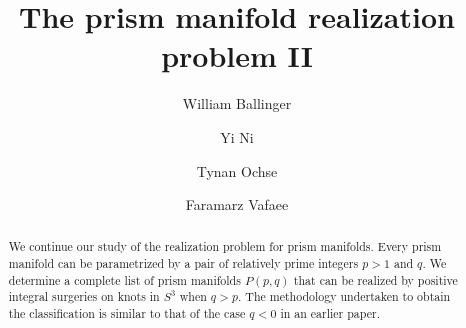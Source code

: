 \documentclass[11pt,reqno]{amsart}
\author[W. Ballinger]{William Ballinger}
\author[Y. Ni]{Yi Ni}
\author[T. Ochse]{Tynan Ochse}
\author[F. Vafaee]{Faramarz Vafaee}
\theoremstyle{definition}
\begin{document}
\title{The prism manifold realization problem II}

\date{}

\maketitle

\begin{abstract}
We continue our study of the realization problem for prism manifolds. Every prism manifold can be parametrized by a pair of relatively prime integers $p>1$ and $q$. We determine a complete list of prism manifolds $P(p, q)$ that can be realized by positive integral surgeries on knots in $S^3$ when $q>p$. The methodology undertaken to obtain the classification is similar to that of the case $q<0$ in an earlier paper.
\end{abstract}













\end{document}

